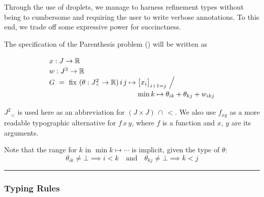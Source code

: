 \cbstart{}%
Through the use of droplets, we manage to harness refinement types without being to 
cumbersome and requiring the user to write verbose annotations.
To this end, we trade off some expressive power for succinctness.
\cbend

\exampleTitle

\noindent
The specification of the Parenthesis problem () will be written as

\vspace{-5mm}
\newcommand\Jsquaredlt{J^2\!\!\!{\scriptscriptstyle _{<}}}
\[
  \renewcommand\arraystretch{1.2}
  \begin{array}{@{}l@{}l@{}l@{}}
    \lspan2{x : J \to \R} \\
    \lspan2{w : J^3 \to \R} \\
    G ~=~ \fix~(\theta:\Jsquaredlt\to\R)\,i\,j \mapsto{}
      & \big[x_i\big]_{i+1=j} ~\Big/ \\
      & \min k\mapsto\theta_{ik}+\theta_{kj}+w_{ikj}
  \end{array}
\]

$\Jsquaredlt$ is used here as an abbreviation for $(J{\times}J)\,{\cap}\,{<}$.
We also use $f_{xy}$
as a more readable typographic alternative for $f\,x\,y$,
where $f$ is a function and $x$, $y$ are its arguments.

Note that the range for $k$ in $\min k\mapsto\cdots$ is implicit, given the type of
$\theta$: 
\vspace{-.5em}
\[\theta_{ik}\neq\bot\implies i<k \quad \mbox{and} \quad \theta_{kj}\neq\bot\implies k<j\]

\vspace{-.5em}
\hrule
\medskip

\iffalse
\newcommand\examplePar{%
\vspace{1pt}\noindent\hspace{-2pt}%
\tikz[baseline=(E.base)]\node(E)[rectangle,draw=black!40!white,rounded corners=.7em] {\bf Example.};
}
\examplePar
The array $G$ computed in the Parenthesis example (\Cref{overview:paren spec}) can be typed using:
\[
\begin{array}{l}
  G : ((J\times J)\cap{<}) \to \R \\
\end{array}
\]

This states that $G\,i\,j$ is only defined for $i<j$. It doesn't {\em force} it to be defined,
as it is still a partial function.
\fi

\subsubsection*{Typing Rules}

